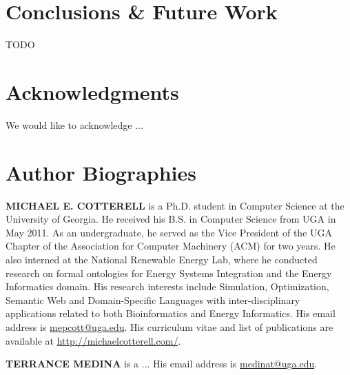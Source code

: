 \documentclass[letterpaper,twocolumn,12pt]{article}
\begin{document}
\section{Conclusions \& Future Work}
TODO

\section*{Acknowledgments}
We would like to acknowledge ...

%

 

\section*{Author Biographies} 
\vspace{8 pt}
\noindent \textbf{MICHAEL E. COTTERELL} is a Ph.D. student in Computer Science at the University of Georgia. 
He received his B.S. in Computer Science from UGA in May 2011. 
As an undergraduate, he served as the Vice President of the UGA Chapter of the Association for Computer Machinery (ACM) for two years. 
He also interned at the National Renewable Energy Lab, where he conducted research on formal ontologies for Energy Systems Integration and the Energy Informatics domain. 
His research interests include Simulation, Optimization, Semantic Web and Domain-Specific Languages with inter-disciplinary applications related to both Bioinformatics and Energy Informatics.
His email address is \href{mailto:mepcott@uga.edu}{mepcott@uga.edu}.
His curriculum vitae and list of publications are available at \url{http://michaelcotterell.com/}.

\vspace{8 pt}
\noindent \textbf{TERRANCE MEDINA} is a ... His email address is \href{mailto:medinat@uga.edu}{medinat@uga.edu}.
\end{document}
